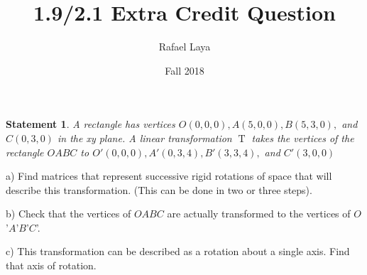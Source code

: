 \documentclass[12pt, letterpaper]{article}
\title{1.9/2.1 Extra Credit Question}
\author{Rafael Laya}
\date{Fall 2018}
\theoremstyle{statement}
\theoremstyle{statement}
\newtheorem*{atmStat}{Statement}
\begin{document}
    \maketitle

    \begin{atmStat}
    A rectangle has vertices $O(0, 0, 0), A(5, 0, 0), B(5, 3, 0),$ and $C(0, 3, 0)$ in the xy plane. A linear transformation $\operatorname{T}$ takes the vertices of the rectangle $OABC$ to $O'(0, 0, 0), A'(0, 3, 4), B'(3, 3, 4),$ and $C'(3, 0, 0)$
    \end{atmStat}
    a) Find matrices that represent successive rigid rotations of space that will describe this transformation. (This can be done in two or three steps).
    
    b) Check that the vertices of $OABC$ are actually transformed to the vertices of $O$’$A$’$B$’$C$’.
    
    c) This transformation can be described as a rotation about a single axis.  Find that axis of rotation.
\end{document}
